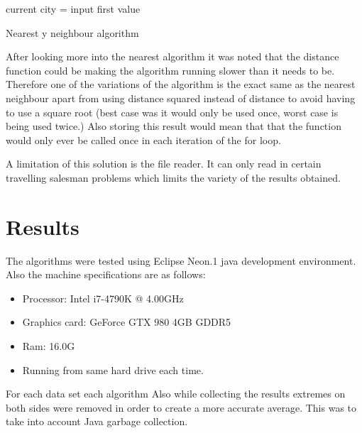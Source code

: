 \documentclass[conference,backref=page]{acmsiggraph}
\begin{document}
\begin{algorithm}
	current city = input first value\\
	\caption{Nearest y neighbour algorithm}
\end{algorithm}



After looking more into the nearest algorithm it was noted that the distance function could be making the algorithm running slower than it needs to be. Therefore one of the variations of the algorithm is the exact same as the nearest neighbour apart from using distance squared instead of distance to avoid having to use a square root (best case was it would only be used once, worst case is being used twice.) Also storing this result would mean that that the function would only ever be called once in each iteration of the for loop. 


A limitation of this solution is the file reader. It can only read in certain travelling salesman problems which limits the variety of the results obtained. 
\section{Results}

The algorithms were tested using Eclipse Neon.1 java development environment. Also the machine specifications are as follows:
\begin{itemize}
\item Processor:	Intel i7-4790K @ 4.00GHz
\item Graphics card:	GeForce GTX 980	4GB GDDR5
\item Ram:	16.0G
\item Running from same hard drive each time. 
\end{itemize}

For each data set each algorithm
Also while collecting the results extremes on both sides were removed in order to create a more accurate average. This was to take into account Java garbage collection.
\end{document}
